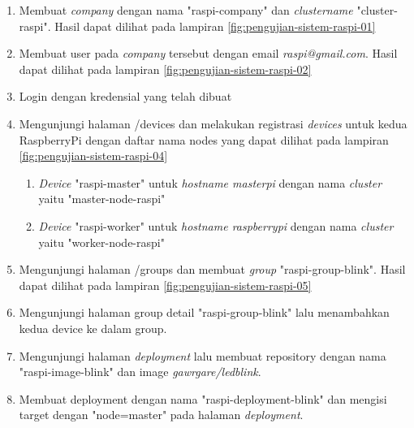 \begin{enumerate}
  \item Membuat \textit{company} dengan nama "raspi-company" dan \textit{cluster\textunderscore name} "cluster-raspi". Hasil dapat dilihat pada lampiran \ref{fig:pengujian-sistem-raspi-01}
  \item Membuat user pada \textit{company} tersebut dengan email \textit{raspi@gmail.com}. Hasil dapat dilihat pada lampiran \ref{fig:pengujian-sistem-raspi-02}
  \item Login dengan kredensial yang telah dibuat
  \item Mengunjungi halaman /devices dan melakukan registrasi \textit{devices} untuk kedua RaspberryPi dengan daftar nama nodes yang dapat dilihat pada lampiran \ref{fig:pengujian-sistem-raspi-04}
        \begin{enumerate}
          \item \textit{Device} "raspi-master" untuk \textit{hostname masterpi} dengan nama \textit{cluster} yaitu "master-node-raspi"
          \item  \textit{Device} "raspi-worker" untuk \textit{hostname raspberrypi} dengan nama \textit{cluster} yaitu "worker-node-raspi"
        \end{enumerate}
  \item Mengunjungi halaman /groups dan membuat \textit{group} "raspi-group-blink". Hasil dapat dilihat pada lampiran \ref{fig:pengujian-sistem-raspi-05}
  \item Mengunjungi halaman group detail "raspi-group-blink" lalu menambahkan kedua device ke dalam group.
  \item Mengunjungi halaman \textit{deployment} lalu membuat repository dengan nama "raspi-image-blink" dan image\textit{ gawrgare/led\textunderscore blink}.
  \item Membuat deployment dengan nama "raspi-deployment-blink" dan mengisi target dengan "node=master" pada halaman \textit{deployment}.
\end{enumerate}

